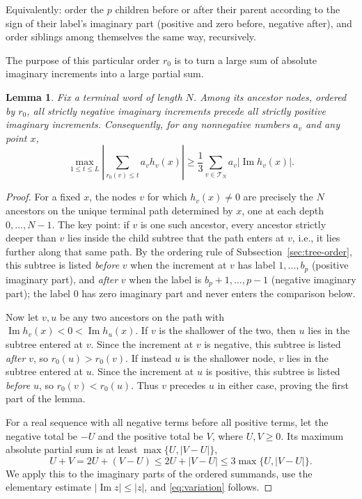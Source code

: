 \documentclass[11pt]{amsart}
\newtheorem{lemma}[theorem]{Lemma}
\theoremstyle{definition}
\theoremstyle{remark}
\newcommand{\T}{\mathcal T}
\DeclareMathOperator{\Impart}{Im}
\begin{document}
Equivalently: order the \(p\) children before or after their parent
according to the sign of their label's imaginary part (positive and
zero before, negative after), and order siblings among themselves the
same way, recursively.


The purpose of this particular order $r_0$ is to turn a large sum of absolute imaginary
increments into a large partial sum.

\begin{lemma}\label{lem:order}
Fix a terminal word of length \(N\). Among its ancestor nodes,
ordered by \(r_0\), all strictly negative imaginary increments
precede all strictly positive imaginary increments.
Consequently, for any nonnegative numbers \(a_v\) and any point \(x\),
\begin{equation}\label{eq:variation}
 \max_{1\leq t\leq L}
 \left|\sum_{r_0(v)\leq t}a_vh_v(x)\right|
 \geq\frac13\sum_{v\in\T_N}a_v|\Impart h_v(x)|.
\end{equation}
\end{lemma}

\begin{proof}
For a fixed \(x\), the nodes \(v\) for which \(h_v(x)\ne0\) are
precisely the \(N\) ancestors on the unique terminal path determined
by \(x\), one at each depth \(0,\ldots,N-1\). The key point: if \(v\)
is one such ancestor, every ancestor strictly deeper than \(v\) lies
inside the child subtree that the path enters at \(v\), i.e., it lies
further along that same path. By the ordering rule of
Subsection~\ref{sec:tree-order}, this
subtree is listed \emph{before} \(v\) when the increment at \(v\) has
label \(1,\ldots,b_p\) (positive imaginary part), and \emph{after}
\(v\) when the label is \(b_p{+}1,\ldots,p{-}1\) (negative imaginary
part); the label \(0\) has zero imaginary part and never enters the
comparison below.

Now let \(v,u\) be any two ancestors on the path with
\(\Impart h_v(x)<0<\Impart h_u(x)\). If \(v\) is the shallower of the
two, then \(u\) lies in the subtree entered at \(v\). Since the
increment at \(v\) is negative, this subtree is listed \emph{after}
\(v\), so
\(r_0(u)>r_0(v)\). If instead \(u\) is the shallower node, \(v\) lies
in the subtree entered at \(u\). Since the increment at \(u\) is
positive, this subtree is listed \emph{before} \(u\), so
\(r_0(v)<r_0(u)\). Thus \(v\) precedes \(u\) in either case, proving
the first part of the lemma.

For a real sequence with all negative terms before all positive
terms, let the negative total be \(-U\) and the positive total
be \(V\), where \(U,V\geq0\). Its maximum absolute partial sum
is at least \(\max\{U,|V-U|\}\),
\[
 U+V=2U+(V-U)\leq 2U+|V-U|
       \leq3\max\{U,|V-U|\}.
\]
We apply this to the imaginary parts of the ordered summands, use the
elementary estimate \(|\Impart z|\leq |z|\), and 
\eqref{eq:variation} follows.
\end{proof}
\end{document}
